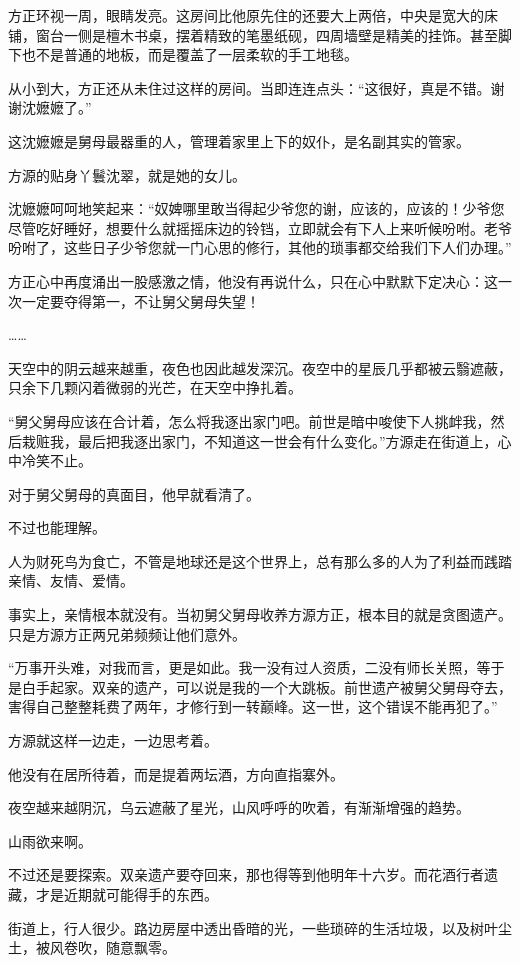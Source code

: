 \begin{this_body}
方正环视一周，眼睛发亮。这房间比他原先住的还要大上两倍，中央是宽大的床铺，窗台一侧是檀木书桌，摆着精致的笔墨纸砚，四周墙壁是精美的挂饰。甚至脚下也不是普通的地板，而是覆盖了一层柔软的手工地毯。

从小到大，方正还从未住过这样的房间。当即连连点头：“这很好，真是不错。谢谢沈嬷嬷了。”

这沈嬷嬷是舅母最器重的人，管理着家里上下的奴仆，是名副其实的管家。

方源的贴身丫鬟沈翠，就是她的女儿。

沈嬷嬷呵呵地笑起来：“奴婢哪里敢当得起少爷您的谢，应该的，应该的！少爷您尽管吃好睡好，想要什么就摇摇床边的铃铛，立即就会有下人上来听候吩咐。老爷吩咐了，这些日子少爷您就一门心思的修行，其他的琐事都交给我们下人们办理。”

方正心中再度涌出一股感激之情，他没有再说什么，只在心中默默下定决心：这一次一定要夺得第一，不让舅父舅母失望！

……

天空中的阴云越来越重，夜色也因此越发深沉。夜空中的星辰几乎都被云翳遮蔽，只余下几颗闪着微弱的光芒，在天空中挣扎着。

“舅父舅母应该在合计着，怎么将我逐出家门吧。前世是暗中唆使下人挑衅我，然后栽赃我，最后把我逐出家门，不知道这一世会有什么变化。”方源走在街道上，心中冷笑不止。

对于舅父舅母的真面目，他早就看清了。

不过也能理解。

人为财死鸟为食亡，不管是地球还是这个世界上，总有那么多的人为了利益而践踏亲情、友情、爱情。

事实上，亲情根本就没有。当初舅父舅母收养方源方正，根本目的就是贪图遗产。只是方源方正两兄弟频频让他们意外。

“万事开头难，对我而言，更是如此。我一没有过人资质，二没有师长关照，等于是白手起家。双亲的遗产，可以说是我的一个大跳板。前世遗产被舅父舅母夺去，害得自己整整耗费了两年，才修行到一转巅峰。这一世，这个错误不能再犯了。”

方源就这样一边走，一边思考着。

他没有在居所待着，而是提着两坛酒，方向直指寨外。

夜空越来越阴沉，乌云遮蔽了星光，山风呼呼的吹着，有渐渐增强的趋势。

山雨欲来啊。

不过还是要探索。双亲遗产要夺回来，那也得等到他明年十六岁。而花酒行者遗藏，才是近期就可能得手的东西。

街道上，行人很少。路边房屋中透出昏暗的光，一些琐碎的生活垃圾，以及树叶尘土，被风卷吹，随意飘零。


\end{this_body}
